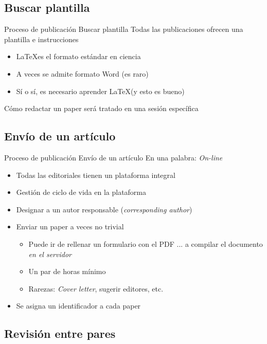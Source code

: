 \documentclass{beamer}
\begin{document}
\subsection{Buscar plantilla}
\begin{frame}{Proceso de publicación} {Buscar plantilla}
	Todas las publicaciones ofrecen una \alert{plantilla} e \alert{instrucciones}
	\begin{itemize}
		\item \alert{\LaTeX es el formato estándar en ciencia}
		\item A veces se admite formato Word (es raro)
		\item Sí o sí, es necesario aprender \LaTeX (y esto es bueno)
	\end{itemize}
	\bigskip
	Cómo redactar un paper será tratado en una sesión específica
\end{frame}

\subsection{Envío de un artículo}
\begin{frame}{Proceso de publicación} {Envío de un artículo}
	En una palabra: \textit{On-line}
	\begin{itemize}
		\item Todas las editoriales tienen un plataforma integral
		\item Gestión de ciclo de vida en la plataforma
		\item Designar a un autor responsable (\textit{corresponding author})
		\item Enviar un paper a veces no trivial
			\begin{itemize}
			\item Puede ir de rellenar un formulario con el PDF ... a compilar el documento \textit{en el servidor}
			\item Un par de horas mínimo
			\item Rarezas: \textit{Cover letter}, sugerir editores, etc.
			\end{itemize}
		\item Se asigna un identificador a cada paper
	\end{itemize}
\end{frame}

\subsection{Revisión entre pares}
\end{document}
